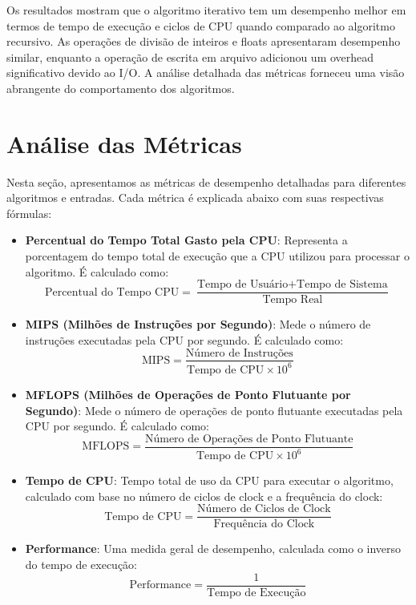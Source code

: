\documentclass[12pt]{article}
\begin{document}
Os resultados mostram que o algoritmo iterativo tem um desempenho melhor em termos de tempo de execução e ciclos de CPU quando comparado ao algoritmo recursivo. As operações de divisão de inteiros e floats apresentaram desempenho similar, enquanto a operação de escrita em arquivo adicionou um overhead significativo devido ao I/O. A análise detalhada das métricas forneceu uma visão abrangente do comportamento dos algoritmos.

\section{Análise das Métricas}

Nesta seção, apresentamos as métricas de desempenho detalhadas para diferentes algoritmos e entradas. Cada métrica é explicada abaixo com suas respectivas fórmulas:

\begin{itemize}
    \item \textbf{Percentual do Tempo Total Gasto pela CPU}: Representa a porcentagem do tempo total de execução que a CPU utilizou para processar o algoritmo. É calculado como:
    \begin{equation}
    \text{Percentual do Tempo CPU} = \frac{\text{Tempo de Usuário} + \text{Tempo de Sistema}}{\text{Tempo Real}}
    \end{equation}

    \item \textbf{MIPS (Milhões de Instruções por Segundo)}: Mede o número de instruções executadas pela CPU por segundo. É calculado como:
    \begin{equation}
    \text{MIPS} = \frac{\text{Número de Instruções}}{\text{Tempo de CPU} \times 10^6}
    \end{equation}

    \item \textbf{MFLOPS (Milhões de Operações de Ponto Flutuante por Segundo)}: Mede o número de operações de ponto flutuante executadas pela CPU por segundo. É calculado como:
    \begin{equation}
    \text{MFLOPS} = \frac{\text{Número de Operações de Ponto Flutuante}}{\text{Tempo de CPU} \times 10^6}
    \end{equation}

    \item \textbf{Tempo de CPU}: Tempo total de uso da CPU para executar o algoritmo, calculado com base no número de ciclos de clock e a frequência do clock:
    \begin{equation}
    \text{Tempo de CPU} = \frac{\text{Número de Ciclos de Clock}}{\text{Frequência do Clock}}
    \end{equation}

    \item \textbf{Performance}: Uma medida geral de desempenho, calculada como o inverso do tempo de execução:
    \begin{equation}
    \text{Performance} = \frac{1}{\text{Tempo de Execução}}
    \end{equation}
\end{itemize}
\end{document}
